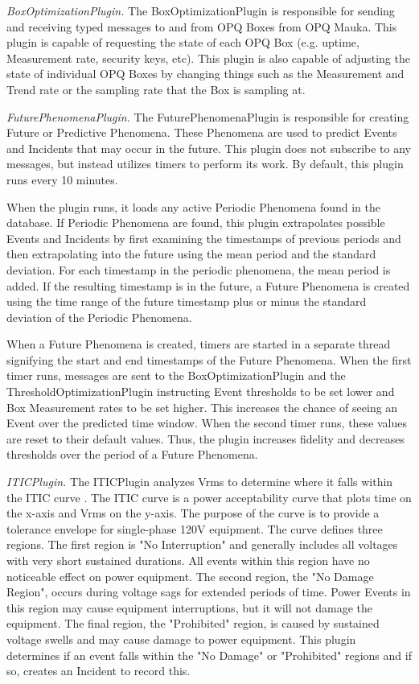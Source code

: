 {\em BoxOptimizationPlugin.} The BoxOptimizationPlugin is responsible for sending and receiving typed messages to and from OPQ Boxes from OPQ Mauka. This plugin is capable of requesting the state of each OPQ Box (e.g. uptime, Measurement rate, security keys, etc). This plugin is also capable of adjusting the state of individual OPQ Boxes by changing things such as the Measurement and Trend rate or the sampling rate that the Box is sampling at.

{\em FuturePhenomenaPlugin.} The FuturePhenomenaPlugin is responsible for creating Future or Predictive Phenomena. These Phenomena are used to predict Events and Incidents that may occur in the future. This plugin does not subscribe to any messages, but instead utilizes timers to perform its work. By default, this plugin runs every 10 minutes.

When the plugin runs, it loads any active Periodic Phenomena found in the database. If Periodic Phenomena are found, this plugin extrapolates possible Events and Incidents by first examining the timestamps of previous periods and then extrapolating into the future using the mean period and the standard deviation. For each timestamp in the periodic phenomena, the mean period is added. If the resulting timestamp is in the future, a Future Phenomena is created using the time range of the future timestamp plus or minus the standard deviation of the Periodic Phenomena.

When a Future Phenomena is created, timers are started in a separate thread signifying the start and end timestamps of the Future Phenomena. When the first timer runs, messages are sent to the BoxOptimizationPlugin and the ThresholdOptimizationPlugin instructing Event thresholds to be set lower and Box Measurement rates to be set higher. This increases the chance of seeing an Event over the predicted time window. When the second timer runs, these values are reset to their default values. Thus, the plugin increases fidelity and decreases thresholds over the period of a Future Phenomena.


{\em ITICPlugin.} The ITICPlugin analyzes Vrms to determine where it falls within the ITIC curve \cite{thallam_power_2000}. The ITIC curve is a power acceptability curve that plots time on the x-axis and Vrms on the y-axis.  The purpose of the curve is to provide a tolerance envelope for single-phase 120V equipment. The curve defines three regions. The first region is "No Interruption" and generally includes all voltages with very short sustained durations. All events within this region have no noticeable effect on power equipment. The second region, the "No Damage Region", occurs during voltage sags for extended periods of time. Power Events in this region may cause equipment interruptions, but it will not damage the equipment. The final region, the "Prohibited" region, is caused by sustained voltage swells and may cause damage to power equipment. This plugin determines if an event falls within the "No Damage" or "Prohibited" regions and if so, creates an Incident to record this.


